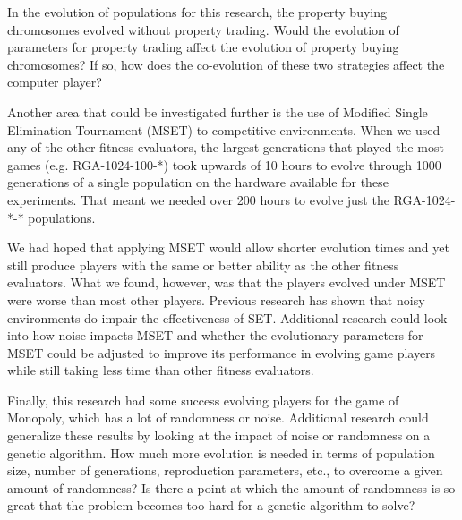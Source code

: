 In the evolution of populations for this research, the property buying
chromosomes evolved without property trading. Would the evolution of parameters
for property trading affect the evolution of property buying chromosomes? If so,
how does the co-evolution of these two strategies affect the computer player?

Another area that could be investigated further is the use of Modified Single
Elimination Tournament (MSET) to competitive environments. When we used any of
the other fitness evaluators, the largest generations that played the most games
(e.g. RGA-1024-100-*) took upwards of 10 hours to evolve through 1000
generations of a single population on the hardware available for these
experiments. That meant we needed over 200 hours to evolve just the RGA-1024-*-*
populations.

We had hoped that applying MSET would allow shorter evolution times and yet
still produce players with the same or better ability as the other fitness
evaluators. What we found, however, was that the players evolved under MSET were
worse than most other players. Previous research has shown that noisy
environments do impair the effectiveness of SET. Additional research could look
into how noise impacts MSET and whether the evolutionary parameters for MSET
could be adjusted to improve its performance in evolving game players while
still taking less time than other fitness evaluators. 

Finally, this research had some success evolving players for the game of
Monopoly, which has a lot of randomness or noise. Additional research could
generalize these results by looking at the impact of noise or randomness on a
genetic algorithm. How much more evolution is needed in terms of population
size, number of generations, reproduction parameters, etc., to overcome a given
amount of randomness? Is there a point at which the amount of randomness is so
great that the problem becomes too hard for a genetic algorithm to solve?






